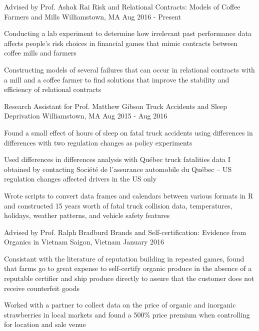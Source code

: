\begin{cventries}
  \cventry
    {Advised by Prof. Ashok Rai}
    {Risk and Relational Contracts: Models of Coffee Farmers and Mills}
    {Williamstown, MA}
    {Aug 2016 - Present}
    {
      \begin{cvitems}
        \item {Conducting a lab experiment to determine how irrelevant past performance data affects people's risk choices in financial games that mimic contracts between coffee mills and farmers}
        \item {Constructing models of several failures that can occur in relational contracts with a mill and a coffee farmer to find solutions that improve the stability and efficiency of relational contracts}
      \end{cvitems}
     }
  \cventry
    {Research Assistant for Prof. Matthew Gibson}
    {Truck Accidents and Sleep Deprivation}
    {Williamstown, MA}
    {Aug 2015 - Aug 2016}
    {
      \begin{cvitems}
        \item {Found a small effect of hours of sleep on fatal truck accidents using differences in differences with two regulation changes as policy experiments}
        \item {Used differences in differences analysis with Québec truck fatalities data I obtained by contacting Société de l'assurance automobile du Québec -- US regulation changes affected drivers in the US only}
        \item{Wrote scripts to convert data frames and calendars between various formats in R and constructed 15 years worth of fatal truck collision data, temperatures, holidays, weather patterns, and vehicle safety features}
      \end{cvitems}
    }
  \cventry
    {Advised by Prof. Ralph Bradburd}
    {Brands and Self-certification: Evidence from Organics in Vietnam}
    {Saigon, Vietnam}
    {January 2016}
    {
      \begin{cvitems}
        \item {Consistant with the literature of reputation building in repeated games, found that farms go to great expense to self-certify organic produce in the absence of a reputable certifier and ship produce directly to assure that the customer does not receive counterfeit goods}
        \item {Worked with a partner to collect data on the price of organic and inorganic strawberries in local markets and found a 500\% price premium when controlling for location and sale venue}

\end{cvitems}}
\end{cventries}
